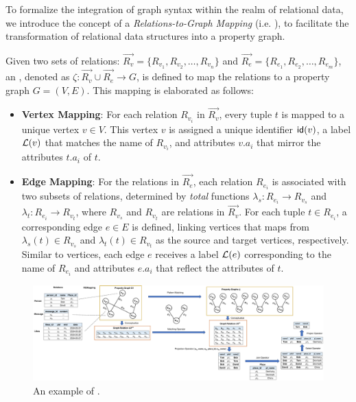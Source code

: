 To formalize the integration of graph syntax within the realm of relational data, we introduce the concept of a \textit{Relations-to-Graph Mapping} (i.e. \rgmapping), to facilitate the transformation of relational data structures into a property graph.

\begin{definition}[\rgmapping, $\zeta$]
\label{def:rgmapping}
Given two sets of relations: \(\vec{R_v} = \{R_{v_1}, R_{v_2}, \ldots, R_{v_n}\}\) and \(\vec{R_e} = \{R_{e_1}, R_{e_2}, \ldots, R_{e_m}\}\), an \rgmapping, denoted as \(\zeta: \vec{R_v} \cup \vec{R_e} \to G\), is defined to map the relations to a property graph \(G = (V, E)\). This mapping is elaborated as follows:

\begin{itemize}
\item \textbf{Vertex Mapping}: For each relation \(R_{v_i}\) in \(\vec{R_v}\), every tuple \(t\) is mapped to a unique vertex \(v \in V\). This vertex \(v\) is assigned a unique identifier \({\mathsf{id}}(v)\), a label \(\mathcal{L}(v)\) that matches the name of \(R_{v_i}\), and attributes \(v.a_i\) that mirror the attributes \(t.a_i\) of \(t\).

\item \textbf{Edge Mapping}: For the relations in \(\vec{R_e}\), each relation \(R_{e_i}\) is associated with two subsets of relations, determined by \emph{total} functions \(\lambda_s: R_{e_i} \to R_{v_s}\) and \(\lambda_t: R_{e_i} \to R_{v_t}\), where \(R_{v_s}\) and \(R_{v_t}\) are relations in \(\vec{R_v}\). For each tuple \(t \in R_{e_i}\), a corresponding edge \(e \in E\) is defined, linking vertices that \rgmapping maps from \(\lambda_s(t) \in R_{v_s}\) and \(\lambda_t(t) \in R_{v_t}\) as the source and target vertices, respectively. Similar to vertices, each edge \(e\) receives a label \(\mathcal{L}(e)\) corresponding to the name of \(R_{e_i}\) and attributes \(e.a_i\) that reflect the attributes of \(t\).

\end{itemize}
\end{definition}


\begin{figure}
    \centering
    \includegraphics[width=\linewidth]{./figures/rgmapping.pdf}
    \caption{An example of \rgmapping.}
    \label{fig:intro-rgmapping-example}
\end{figure}

